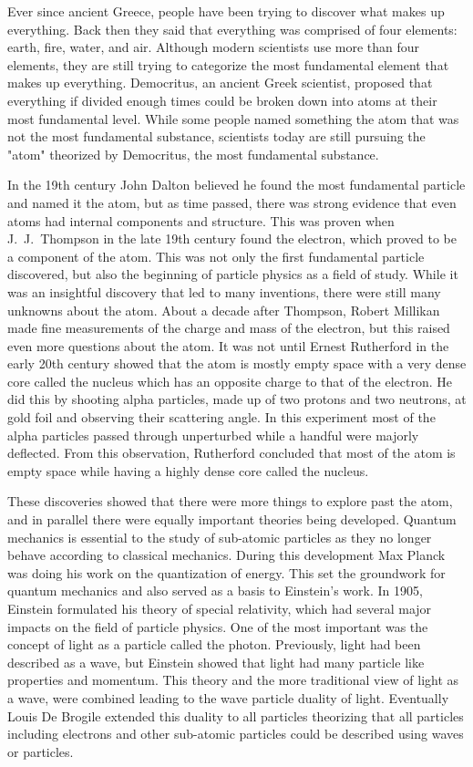 Ever since ancient Greece, people have been trying to discover what makes up everything. Back then they said that everything was comprised of four elements: earth, fire, water, and air. Although modern scientists use more than four elements, they are still trying to categorize the most fundamental element that makes up everything. Democritus, an ancient Greek scientist, proposed that everything if divided enough times could be broken down into atoms at their most fundamental level. While some people named something the atom that was not the most fundamental substance, scientists today are still pursuing the "atom" theorized by Democritus, the most fundamental substance. 

In the 19th century John Dalton believed he found the most fundamental particle and named it the atom, but as time passed, there was strong evidence that even atoms had internal components and structure. This was proven when J.~J.~Thompson in the late 19th century found the electron, which proved to be a component of the atom. This was not only the first fundamental particle discovered, but also the beginning of particle physics as a field of study. While it was an insightful discovery that led to many inventions, there were still many unknowns about the atom. About a decade after Thompson, Robert Millikan made fine measurements of the charge and mass of the electron, but this raised even more questions about the atom. It was not until Ernest Rutherford in the early 20th century showed that the atom is mostly empty space with a very dense core called the nucleus which has an opposite charge to that of the electron. He did this by shooting alpha particles, made up of two protons and two neutrons, at gold foil and observing their scattering angle. In this experiment most of the alpha particles passed through unperturbed while a handful were majorly deflected. From this observation, Rutherford concluded that most of the atom is empty space while having a highly dense core called the nucleus. 

These discoveries showed that there were more things to explore past the atom, and in parallel there were equally important theories being developed. Quantum mechanics is essential to the study of sub-atomic particles as they no longer behave according to classical mechanics. During this development Max Planck was doing his work on the quantization of energy. This set the groundwork for quantum mechanics and also served as a basis to Einstein's work. In 1905, Einstein formulated his theory of special relativity, which had several major impacts on the field of particle physics. One of the most important was the concept of light as a particle called the photon. Previously, light had been described as a wave, but Einstein showed that light had many particle like properties and momentum. This theory and the more traditional view of light as a wave, were combined leading to the wave particle duality of light. Eventually Louis De Brogile extended this duality to all particles theorizing that all particles including electrons and other sub-atomic particles could be described using waves or particles.

